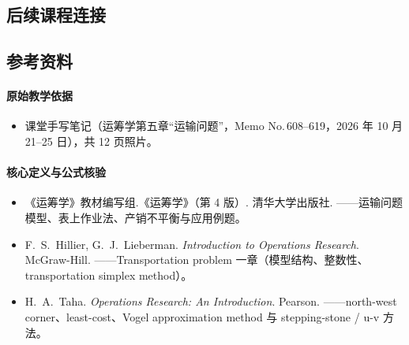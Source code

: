 \subsection*{后续课程连接}
\begin{center}
\end{center}

\subsection*{参考资料}
\paragraph{原始教学依据}
\begin{itemize}
\item 课堂手写笔记（运筹学第五章“运输问题”，Memo No.\,608--619，2026 年 10 月 21--25 日），共 12 页照片。
\end{itemize}
\paragraph{核心定义与公式核验}
\begin{itemize}
\item 《运筹学》教材编写组.《运筹学》（第 4 版）. 清华大学出版社. ——运输问题模型、表上作业法、产销不平衡与应用例题。
\item F.~S.~Hillier, G.~J.~Lieberman. \emph{Introduction to Operations Research}. McGraw-Hill. ——Transportation problem 一章（模型结构、整数性、transportation simplex method）。
\item H.~A.~Taha. \emph{Operations Research: An Introduction}. Pearson. ——north-west corner、least-cost、Vogel approximation method 与 stepping-stone / u-v 方法。
\end{itemize}
